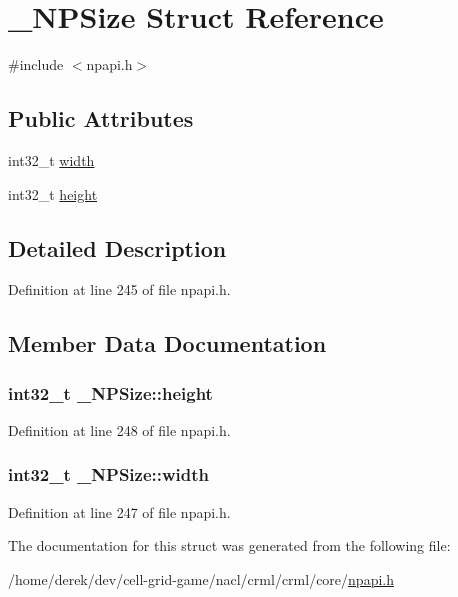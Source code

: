 \hypertarget{struct___n_p_size}{
\section{\_\-NPSize Struct Reference}
\label{struct___n_p_size}
}


{\ttfamily \#include $<$npapi.h$>$}

\subsection*{Public Attributes}
\begin{DoxyCompactItemize}
\item 
int32\_\-t \hyperlink{struct___n_p_size_a4f3ac6a4b529274d4985c43cc324cdf5}{width}
\item 
int32\_\-t \hyperlink{struct___n_p_size_a4ddfb83d602bf6f5eb7bf39cb02914ed}{height}
\end{DoxyCompactItemize}


\subsection{Detailed Description}


Definition at line 245 of file npapi.h.



\subsection{Member Data Documentation}
\hypertarget{struct___n_p_size_a4ddfb83d602bf6f5eb7bf39cb02914ed}{
\subsubsection[{height}]{\setlength{\rightskip}{0pt plus 5cm}int32\_\-t {\bf \_\-NPSize::height}}}
\label{struct___n_p_size_a4ddfb83d602bf6f5eb7bf39cb02914ed}


Definition at line 248 of file npapi.h.

\hypertarget{struct___n_p_size_a4f3ac6a4b529274d4985c43cc324cdf5}{
\subsubsection[{width}]{\setlength{\rightskip}{0pt plus 5cm}int32\_\-t {\bf \_\-NPSize::width}}}
\label{struct___n_p_size_a4f3ac6a4b529274d4985c43cc324cdf5}


Definition at line 247 of file npapi.h.



The documentation for this struct was generated from the following file:\begin{DoxyCompactItemize}
\item 
/home/derek/dev/cell-\/grid-\/game/nacl/crml/crml/core/\hyperlink{npapi_8h}{npapi.h}\end{DoxyCompactItemize}
